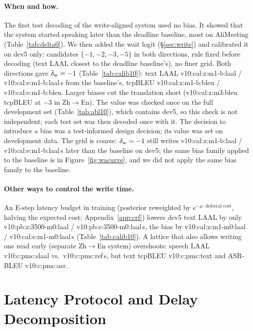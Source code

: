 \paragraph{When and how.} The first test decoding of the write-aligned system used no bias. It showed that the
system started speaking later than the deadline baseline, most on AliMeeting (Table~\ref{tab:delta0}). We then added
the wait logit (\S\ref{sec:write}) and calibrated it on dev5 only: candidates $\{-1,-2,-3,-5\}$ in both directions, rule fixed before
decoding (text LAAL closest to the deadline baseline's), no finer grid. Both directions gave $\delta_{\mathrm{w}}=-1$
(Table~\ref{tab:calib10}): text LAAL \num{v10:cal:z:m1-b:laal} / \num{v10:cal:e:m1-b:laal}\,s from the baseline's,
tcpBLEU \num{v10:cal:z:m1-b:bleu} / \num{v10:cal:e:m1-b:bleu}. Larger biases cut the translation short
(\num{v10:cal:z:m3:bleu} tcpBLEU at $-3$ in Zh$\rightarrow$En). The value was checked once on the full development set
(Table~\ref{tab:abl10}), which contains dev5, so this check is not independent; each test set was then decoded once with
it. The decision to introduce a bias was a test-informed design decision; its value was set on development data. The
grid is coarse: $\delta_{\mathrm{w}}=-1$ still writes \num{v10:cal:z:m1-b:laal} / \num{v10:cal:e:m1-b:laal}\,s later than the baseline
on dev5\ifWAcurve{}; the same bias family applied to the baseline is in Figure~\ref{fig:wacurve}\else{}, and we did not apply the same bias family to the baseline\fi.

\paragraph{Other ways to control the write time.} An E-step latency budget in training (posterior reweighted by
$e^{-\mu\cdot\text{deferral cost}}$, halving the expected cost; Appendix~\ref{app:crf}) lowers dev5 text LAAL by
only \num{v10:pb:z:3500-m0:laal} / \num{v10:pb:e:3500-m0:laal}\,s, the bias by \num{v10:cal:z:m1-m0:laal} /
\num{v10:cal:e:m1-m0:laal}\,s (Table~\ref{tab:calib10}). A lattice that also allows writing one read early (separate
Zh$\rightarrow$En system) overshoots: speech LAAL \num{v10:c:pmc:slaal} vs.\ \num{v10:c:pmc:ref}\,s, but text tcpBLEU
\num{v10:c:pmc:text} and ASR-BLEU \num{v10:c:pmc:asr}.





\section{Latency Protocol and Delay Decomposition}
\label{app:chunk}

